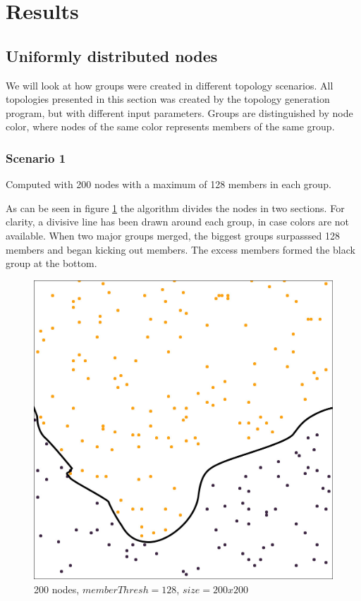 \section{Results}

\subsection{Uniformly distributed nodes}
We will look at how groups were created in different topology scenarios. 
All topologies presented in this section was created by the topology generation program,
but with different input parameters. Groups are distinguished by node color, where nodes
of the same color represents members of the same group. 
\subsubsection{Scenario 1}
Computed with 200 nodes with a maximum of 128 members in each group.

As can be seen in figure \ref{fig:200_128} the algorithm divides the nodes in two
sections. For clarity, a divisive line has been drawn around each group,
in case colors are not available.
When two major groups merged, the biggest groups surpasssed 128 members and began
kicking out members. The excess members formed the black group at the bottom. 

\begin{figure}
\center
\includegraphics[scale=0.45]{Images/grouptest_1.jpg}
\caption{200 nodes, $memberThresh=128$, $size=200x200$}
\label{fig:200_128}
\end{figure}


